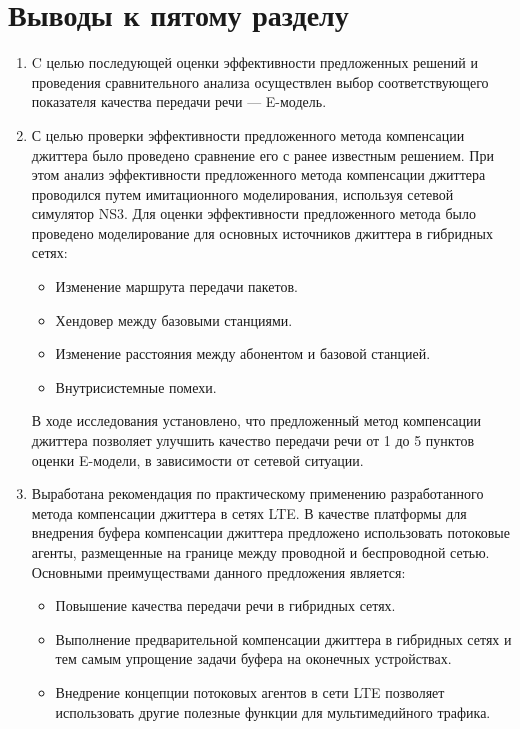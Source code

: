 \section{Выводы к пятому разделу} \label{sect:concl4}
\begin{enumerate}
 \item C целью последующей оценки эффективности предложенных решений и проведения сравнительного анализа осуществлен выбор соответствующего показателя качества передачи речи --- E-модель.
 \item С целью проверки эффективности предложенного метода компенсации джиттера было проведено сравнение его с ранее известным решением.
 При этом анализ эффективности предложенного метода компенсации джиттера проводился путем имитационного моделирования, используя сетевой симулятор NS3.
 Для оценки эффективности предложенного метода было проведено моделирование для основных источников джиттера в гибридных сетях:
 \begin{itemize}
  \item Изменение маршрута передачи пакетов.
  \item Хендовер между базовыми станциями.
  \item Изменение расстояния между абонентом и базовой станцией.
  \item Внутрисистемные помехи.
 \end{itemize}
 В ходе исследования установлено, что предложенный метод компенсации джиттера позволяет улучшить качество передачи речи от 1 до 5 пунктов оценки E-модели, в зависимости от сетевой ситуации.
 \item Выработана рекомендация по практическому применению разработанного метода компенсации джиттера в сетях LTE.
 В качестве платформы для внедрения буфера компенсации джиттера предложено использовать потоковые агенты, размещенные на границе между проводной и беспроводной сетью.
 Основными преимуществами данного предложения является:
 \begin{itemize}
  \item Повышение качества передачи речи в гибридных сетях.
  \item Выполнение предварительной компенсации джиттера в гибридных сетях и тем самым упрощение задачи буфера на оконечных устройствах.
  \item Внедрение концепции потоковых агентов в сети LTE позволяет использовать другие полезные функции для мультимедийного трафика.
 \end{itemize}

\end{enumerate}




